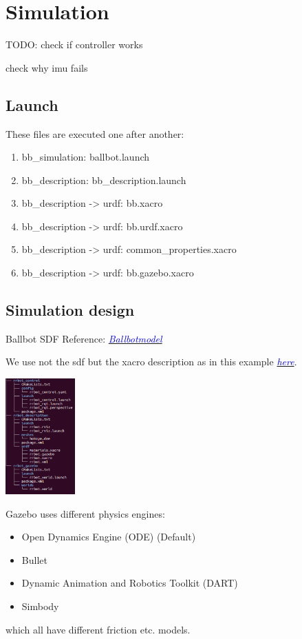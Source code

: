 \documentclass[twoside,colorback,accentcolor=tud4c,11pt]{tudreport}
\newcommand{\mylink}[2] {	\href{#1}{	\textit{\textcolor{blue}{#2}}}}
\begin{document}
\chapter{Simulation}

TODO: 
check if controller works

check why imu fails

\section{Launch}
These files are executed one after another:
\begin{enumerate}
	\item bb\_simulation: ballbot.launch
	\item bb\_description: bb\_description.launch
	\item bb\_description -> urdf: bb.xacro
	\item bb\_description -> urdf: bb.urdf.xacro
	\item bb\_description -> urdf: common\_properties.xacro
	\item bb\_description -> urdf: bb.gazebo.xacro
\end{enumerate}

\section{Simulation design}

Ballbot SDF Reference:
\mylink{https://bitbucket.org/osrf/gazebo/issues/2335/how-to-set-the-friction-of-ballbot-the}{Ballbotmodel} 

We use not the sdf but the xacro description as in this example \mylink{http://gazebosim.org/tutorials/?tut=ros_urdf}{here}.

\begin{center}
		\includegraphics[width=0.2\textwidth]{img/filestructure.png} 
\end{center}

Gazebo uses different physics engines:\\
\begin{itemize}
	\item Open Dynamics Engine (ODE) (Default)
	\item Bullet
	\item Dynamic Animation and Robotics Toolkit (DART)
	\item Simbody
\end{itemize}
 which all have different friction etc. models.
\end{document}
